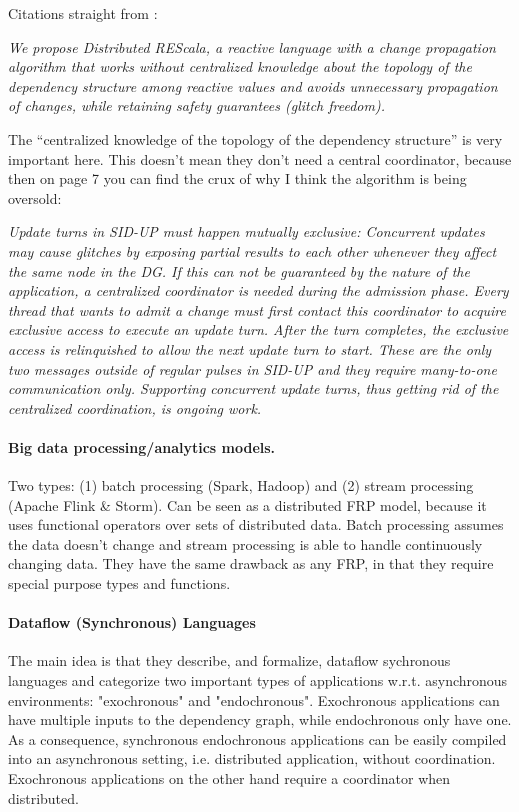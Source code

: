 Citations straight from \cite{drescala}:

\emph{We propose Distributed REScala, a reactive language
with a change propagation algorithm that works without
centralized knowledge about the topology of the dependency
structure among reactive values and avoids unnecessary
propagation of changes, while retaining safety guarantees
(glitch freedom).}

The ``centralized knowledge of the topology of the dependency structure'' is very important here. This doesn't mean they don't need a central coordinator, because then on page 7 you can find the crux of why I think the algorithm is being oversold:

\emph{Update turns in SID-UP must happen mutually exclusive:
Concurrent updates may cause glitches by exposing partial
results to each other whenever they affect the same node in
the DG. If this can not be guaranteed by the nature of the
application, a centralized coordinator is needed during the
admission phase. Every thread that wants to admit a change
must first contact this coordinator to acquire exclusive access
to execute an update turn. After the turn completes, the
exclusive access is relinquished to allow the next update turn
to start. These are the only two messages outside of regular
pulses in SID-UP and they require many-to-one communication
only. Supporting concurrent update turns, thus getting
rid of the centralized coordination, is ongoing work.}


\paragraph{Big data processing/analytics models.} Two types: (1) batch processing (Spark, Hadoop) \cite{mapreduce} and (2) stream processing (Apache Flink \& Storm). Can be seen as a  distributed FRP model, because it uses functional operators over sets of distributed data. Batch processing assumes the data doesn't change and stream processing is able to handle continuously changing data. They have the same drawback as any FRP, in that they require special purpose types and functions.


\paragraph{Dataflow (Synchronous) Languages}
\cite{syncdataflow}
The main idea is that they describe, and formalize, dataflow sychronous languages and categorize two important types of applications w.r.t. asynchronous environments: "exochronous" and "endochronous". Exochronous applications can have multiple inputs to the dependency graph, while endochronous only have one. As a consequence, synchronous endochronous applications can be easily compiled into an asynchronous setting, i.e. distributed application, without coordination. Exochronous applications on the other hand require a coordinator when distributed. \newline

